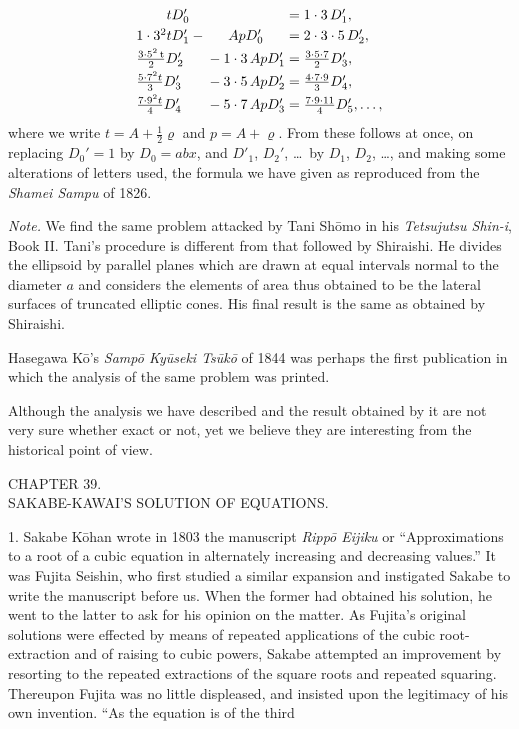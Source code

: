 \documentclass[11pt]{article}
\newcommand{\scanpage}[2]{\clearpage\setcounter{footnote}{0}\noindent{\footnotesize\color{gray}PDF page #1 · #2}\par\medskip}
\begin{document}
\scanpage{0274}{printed page 260 (top left)}
\[
\begin{array}{@{}l@{}c@{}l@{}}
\phantom{1\cdot 3^2}tD_0' & & {}=1\cdot 3\,D_1',\\[1mm]
1\cdot 3^2tD_1'-{} & ApD_0' & {}=2\cdot 3\cdot 5\,D_2',\\[1mm]
\frac{3\cdot 5^2\,\mathrm{t}}{2}D_2' & {}-1\cdot 3\,ApD_1' & {}=\frac{3\cdot 5\cdot 7}{2}D_3',\\[1mm]
\frac{5\cdot 7^2t}{3}D_3' & {}-3\cdot 5\,ApD_2' & {}=\frac{4\cdot 7\cdot 9}{3}D_4',\\[1mm]
\frac{7\cdot 9^2t}{4}D_4' & {}-5\cdot 7\,ApD_3' & {}=\frac{7\cdot 9\cdot 11}{4}D_5',\ldots,
\end{array}
\]
where we write $t=A+\frac{1}{2}\varrho$ and $p=A+\varrho$. From these follows at once, on replacing $D_0'=1$ by $D_0=abx$, and $D'_1$, $D_2'$, \ldots\ by $D_1$, $D_2$, \ldots, and making some alterations of letters used, the formula we have given as reproduced from the \emph{Shamei Sampu} of 1826.

\emph{Note.} We find the same problem attacked by Tani Shōmo in his \emph{Tetsujutsu Shin-i}, Book II. Tani's procedure is different from that followed by Shiraishi. He divides the ellipsoid by parallel planes which are drawn at equal intervals normal to the diameter $a$ and considers the elements of area thus obtained to be the lateral surfaces of truncated elliptic cones. His final result is the same as obtained by Shiraishi.

Hasegawa Kō's \emph{Sampō Kyūseki Tsūkō} of 1844 was perhaps the first publication in which the analysis of the same problem was printed.

Although the analysis we have described and the result obtained by it are not very sure whether exact or not, yet we believe they are interesting from the historical point of view.

\begin{center}
CHAPTER 39.\\[1mm]
SAKABE-KAWAI'S SOLUTION OF EQUATIONS.
\end{center}

1. Sakabe Kōhan wrote in 1803 the manuscript \emph{Rippō Eijiku} or ``Approximations to a root of a cubic equation in alternately increasing and decreasing values.'' It was Fujita Seishin, who first studied a similar expansion and instigated Sakabe to write the manuscript before us. When the former had obtained his solution, he went to the latter to ask for his opinion on the matter. As Fujita's original solutions were effected by means of repeated applications of the cubic root-extraction and of raising to cubic powers, Sakabe attempted an improvement by resorting to the repeated extractions of the square roots and repeated squaring. Thereupon Fujita was no little displeased, and insisted upon the legitimacy of his own invention. ``As the equation is of the third
\end{document}

